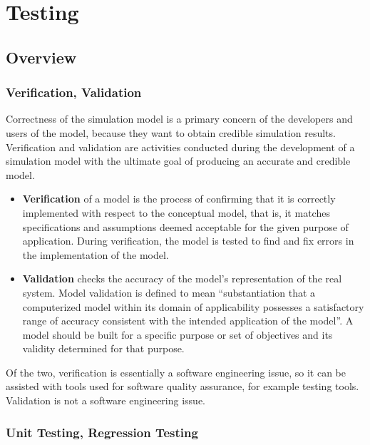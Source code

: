 \chapter{Testing}
\label{cha:testing}

\section{Overview}
\label{sec:testing:overview}

\subsection{Verification, Validation}
\label{sec:testing:verification-validation}

Correctness of the simulation model is a primary concern of the developers
and users of the model, because they want to obtain credible simulation
results. Verification and validation are activities conducted during the
development of a simulation model with the ultimate goal of producing an
accurate and credible model.

\begin{itemize}
\item \textbf{Verification} of a model is the process of confirming that it is
    correctly implemented with respect to the conceptual model, that is, it
    matches specifications and assumptions deemed acceptable for the given
    purpose of application. During verification, the model is tested to find
    and fix errors in the implementation of the model.
\item \textbf{Validation} checks the accuracy of the model's representation of
    the real system. Model validation is defined to mean ``substantiation that
    a computerized model within its domain of applicability possesses a
    satisfactory range of accuracy consistent with the intended application of
    the model''. A model should be built for a specific purpose or set of
    objectives and its validity determined for that purpose.
\end{itemize}

Of the two, verification is essentially a software engineering issue, so it
can be assisted with tools used for software quality assurance, for example
testing tools. Validation is not a software engineering issue.

\subsection{Unit Testing, Regression Testing}
\label{sec:testing:unit-testing-regression-testing}

